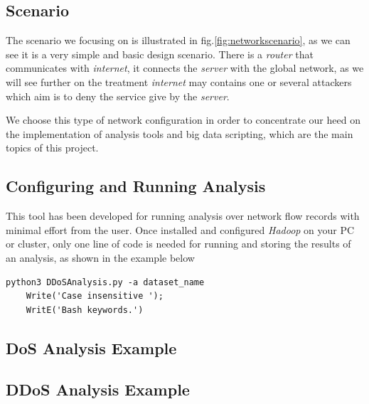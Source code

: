 \subsection{Scenario} 
The scenario we focusing on is illustrated in fig.\ref{fig:networkscenario}, as we can see it is a very simple and basic design scenario. There is a \textit{router} that communicates with \textit{internet},  it connects the \textit{server} with the global network, as we will see further on the treatment \textit{internet} may contains one or several attackers which aim is to deny the service give by the \textit{server}. 


We choose this type of network configuration in order to concentrate our heed on the implementation of analysis tools and big data scripting, which are the main topics of this project.
 
\subsection{Configuring and Running Analysis}
This tool has been developed for running analysis over network flow records with minimal effort from the user. Once installed and configured \textit{Hadoop} on your PC or cluster, only one line of code is needed for running and storing the results of an analysis, as shown in the example below

\begin{lstlisting}[firstline=1, lastline=1]
   python3 DDoSAnalysis.py -a dataset_name
	Write('Case insensitive '); 
	WritE('Bash keywords.')
\end{lstlisting}

\subsection{DoS Analysis Example}

\subsection{DDoS Analysis Example}




















